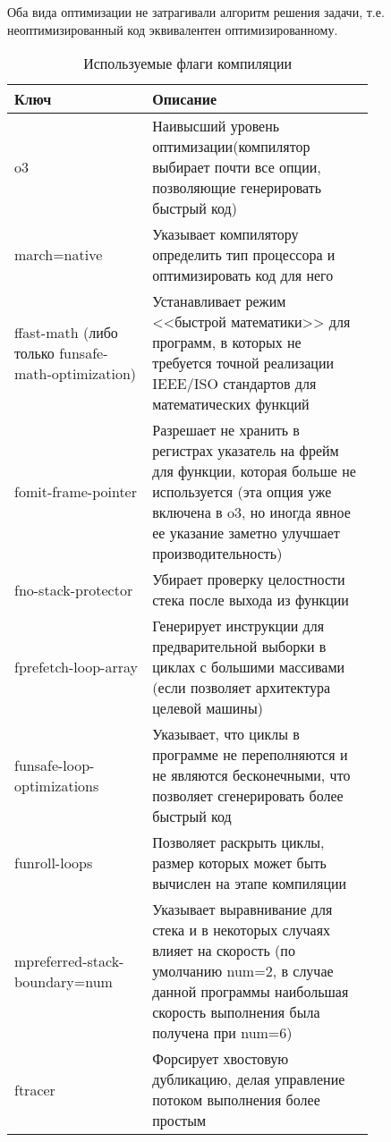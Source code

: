 Оба вида оптимизации не затрагивали алгоритм решения задачи, т.е. неоптимизированный код эквивалентен оптимизированному.

\begin{table}[H]
    \label{tab:CXXFLAGS}
    \caption{Используемые флаги компиляции}
    \begin{center}
    \large{
	\begin{tabular}{|p{0.3\linewidth}|p{0.5\linewidth}|}
	    \hline
	    Ключ & Описание\\
	    \hline
	    o3 & Наивысший уровень оптимизации(компилятор выбирает почти все опции, позволяющие генерировать быстрый код)\\
	    \hline
	    march=native & Указывает компилятору определить тип процессора и оптимизировать код для него\\
	    \hline
	    ffast-math (либо только funsafe-math-optimization) & Устанавливает режим <<быстрой математики>> для программ, в которых не требуется точной реализации IEEE/ISO стандартов для математических функций\\
	    \hline
	    fomit-frame-pointer & Разрешает не хранить в регистрах указатель на фрейм для функции, которая больше не используется (эта опция уже включена в o3, но иногда явное ее указание заметно улучшает производительность)\\
	    \hline
	    fno-stack-protector & Убирает проверку целостности стека после выхода из функции\\
	    \hline
	    fprefetch-loop-array & Генерирует инструкции для предварительной выборки в циклах с большими массивами (если позволяет архитектура целевой машины)\\
	    \hline
	    funsafe-loop-optimizations & Указывает, что циклы в программе не переполняются и не являются бесконечными, что позволяет сгенерировать более быстрый код\\
	    \hline
	    funroll-loops & Позволяет раскрыть циклы, размер которых может быть вычислен на этапе компиляции\\
	    \hline
	    mpreferred-stack-boundary=num & Указывает выравнивание для стека и в некоторых случаях влияет на скорость (по умолчанию num=2, в случае данной программы наибольшая скорость выполнения была получена при num=6)\\
	    \hline
	    ftracer & Форсирует хвостовую дубликацию, делая управление потоком выполнения более простым\\
	    \hline
	\end{tabular}
	}
    \end{center}
\end{table}

